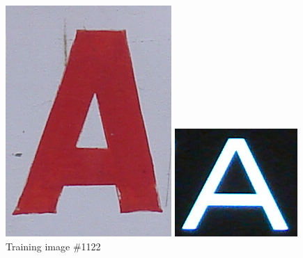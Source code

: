 \documentclass{article}
\begin{document}
\begin{figure}[!htb]
  \includegraphics[width=\linewidth]{1122/original.png}
  \caption{Training image \#1122}\label{fig:awesome_image1}
\endminipage\hfill
{}
  \includegraphics[width=\linewidth]{1653/original.png}

\end{figure}
\end{document}
